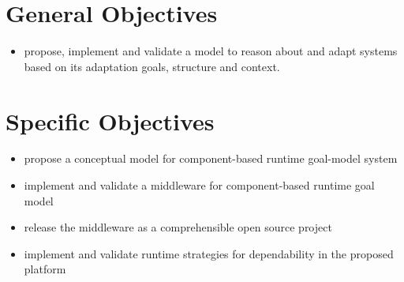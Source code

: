 \section{General Objectives}
\begin{itemize}
  \item propose, implement and validate a model to reason about and adapt systems based on its adaptation goals, structure and context.
\end{itemize}

\section{Specific Objectives}
\begin{itemize}
  \item propose a conceptual model for component-based runtime goal-model system
  \item implement and validate a middleware for component-based runtime goal model
  \item release the middleware as a comprehensible open source project
  \item implement and validate runtime strategies for dependability in the proposed platform
\end{itemize}
